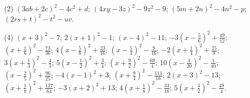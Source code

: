 \documentclass[11pt,a4paper]{scrartcl}
\begin{document}
\begin{problem} \phantom{text}
\begin{tasks}[label={(\arabic*)}, label-offset=0.9em](2)
	\task $(3ab+2c)^2-4c^2+d$;
	\task $(4xy-3z)^2-9z^2-9$;
	\task $(5m+2n)^2-4n^2-p$;
	\task $(2rs+t)^2-t^2-uv$.
\end{tasks}
\end{problem}

\begin{problem} \phantom{text}
\begin{tasks}[label={(\arabic*)}, label-offset=0.9em](4)
	\task $(x+3)^2-7$;
	\task $2(x+1)^2-1$;
	\task $(x-4)^2-11$;
	\task $-3\left(x-\frac{5}{6}\right)^2+\frac{49}{12}$;
	\task $\left(x+\frac{1}{6}\right)^2-\frac{73}{36}$;
	\task $4\left(x-\frac{5}{8}\right)^2+\frac{23}{16}$;
	\task $\left(x-\frac{5}{4}\right)^2-\frac{9}{16}$;
	\task $-2\left(x+\frac{1}{4}\right)^2+\frac{25}{8}$;
	\task $3\left(x+\frac{1}{3}\right)^2-\frac{4}{3}$;
	\task $5\left(x-\frac{1}{2}\right)^2+\frac{3}{4}$;
	\task $\left(x+\frac{9}{2}\right)^2-\frac{69}{4}$;
	\task $10\left(x-\frac{1}{20}\right)^2-\frac{1}{40}$;
	\task $\left(x-\frac{2}{5}\right)^2+\frac{96}{25}$;
	\task $-4(x-1)^2+3$;
	\task $\left(x+\frac{9}{4}\right)^2-\frac{113}{16}$;
	\task $2(x-3)^2-13$;
	\task $\left(x+\frac{1}{8}\right)^2+\frac{127}{64}$;
	\task $-3(x+2)^2+13$;
	\task $4\left(x+\frac{1}{8}\right)^2-\frac{33}{16}$;
	\task $5\left(x+\frac{3}{2}\right)^2-\frac{49}{4}$.
\end{tasks}
\end{problem}
\end{document}
